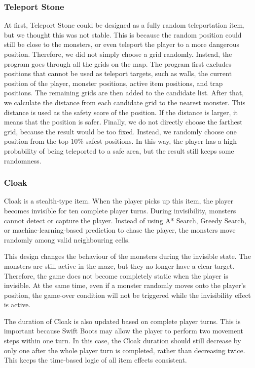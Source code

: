 \documentclass[12pt,a4paper]{article}
\begin{document}
\subsubsection{Teleport Stone}

At first, Teleport Stone could be designed as a fully random teleportation item, but we thought this was not stable. This is because the random position could still be close to the monsters, or even teleport the player to a more dangerous position. Therefore, we did not simply choose a grid randomly. Instead, the program goes through all the grids on the map.
The program first excludes positions that cannot be used as teleport targets, such as walls, the current position of the player, monster positions, active item positions, and trap positions. The remaining grids are then added to the candidate list. After that, we calculate the distance from each candidate grid to the nearest monster. This distance is used as the safety score of the position. If the distance is larger, it means that the position is safer.
Finally, we do not directly choose the farthest grid, because the result would be too fixed. Instead, we randomly choose one position from the top $10\%$ safest positions. In this way, the player has a high probability of being teleported to a safe area, but the result still keeps some randomness.

\subsubsection{Cloak}

Cloak is a stealth-type item. When the player picks up this item, the player becomes invisible for ten complete player turns. During invisibility, monsters cannot detect or capture the player. Instead of using A* Search, Greedy Search, or machine-learning-based prediction to chase the player, the monsters move randomly among valid neighbouring cells.

This design changes the behaviour of the monsters during the invisible state. The monsters are still active in the maze, but they no longer have a clear target. Therefore, the game does not become completely static when the player is invisible. At the same time, even if a monster randomly moves onto the player’s position, the game-over condition will not be triggered while the invisibility effect is active.

The duration of Cloak is also updated based on complete player turns. This is important because Swift Boots may allow the player to perform two movement steps within one turn. In this case, the Cloak duration should still decrease by only one after the whole player turn is completed, rather than decreasing twice. This keeps the time-based logic of all item effects consistent.
\end{document}
